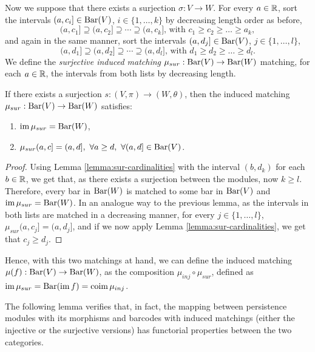 Now we suppose that there exists a surjection $ \sigma: V \to W $. For every $ a \in \mathbb R$, sort the intervals $(a, c_i] \in \operatorname{Bar}(V) $, $i \in \{1, \dots, k\} $ by decreasing length order as before,
$$
    (a, c_1] \supseteq (a, c_2] \supseteq \cdots \supseteq (a, c_k] \text{, with } c_1 \geq c_2 \geq \dots \geq a_k,
$$
and again in the same manner, sort the intervals $(a, d_j] \in \operatorname{Bar}(V) $, $j \in \{1, \dots, l\} $,
$$
    (a, d_1] \supseteq (a, d_2] \supseteq \cdots \supseteq (a, d_l] \text{, with } d_1 \geq d_2 \geq \dots \geq d_l.
$$
We define the {\it surjective induced matching} $\mu_{sur}: \operatorname{Bar}(V) \to \operatorname{Bar}(W) $ matching, for each $ a \in \mathbb R $, the intervals from both lists by decreasing length.

\begin{lemma} \label{lemma:sur-matching}%
    If there exists a surjection $s: (V, \pi) \to (W, \theta) $, then the induced matching $ \mu_{sur}: \operatorname{Bar}(V) \to \operatorname{Bar} (W) $ satisfies:
    \begin{enumerate}
        \item $\operatorname{im} \mu_{sur} = \operatorname{Bar}(W)$,
        \item $\mu_{sur}(a, c] = (a, d], \ \forall a \geq d, \ \forall (a, d] \in \operatorname{Bar}(V)$.
    \end{enumerate}
\end{lemma}
\begin{proof}
    Using Lemma \ref{lemma:sur-cardinalities} with the interval $(b, d_k)$ for each $ b \in \mathbb R $, we get that, as there exists a surjection between the modules, now $ k \geq l $. Therefore, every bar in $\operatorname{Bar}(W)$ is matched to some bar in $\operatorname{Bar}(V)$ and $\operatorname{im} \mu_{sur} = \operatorname{Bar}(W)$. In an analogue way to the previous lemma, as the intervals in both lists are matched in a decreasing manner, for every $j \in \{1, \dots, l\} $, $\mu_{sur}(a, c_j] = (a, d_j] $, and if we now apply Lemma \ref{lemma:sur-cardinalities}, we get that $ c_j \geq d_j $.
\end{proof}

Hence, with this two matchings at hand, we can define the {induced matching} $ \mu(f): \operatorname{Bar}(V) \to \operatorname{Bar}(W) $, as the composition $ \mu_{inj} \circ \mu_{sur} $, defined as $ \operatorname{im} \mu_{sur} = \operatorname{Bar}(\operatorname{im} f) = \operatorname{coim} \mu_{inj} $.

The following lemma verifies that, in fact, the mapping between persistence modules with its morphisms and barcodes with induced matchings (either the injective or the surjective versions) has functorial properties between the two categories.

